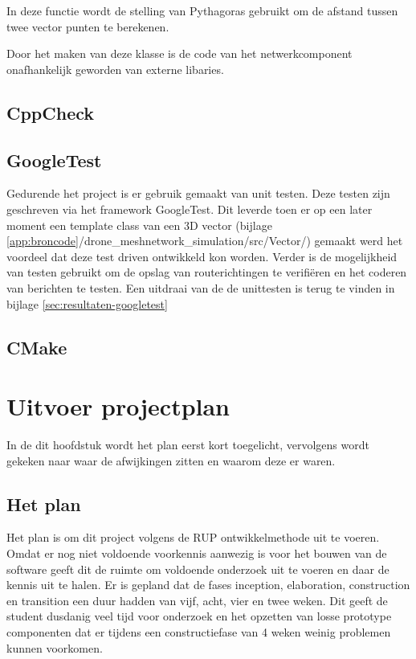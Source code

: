 \documentclass[a4paper, 11pt, oneside]{report}
\begin{document}
In deze functie wordt de stelling van Pythagoras gebruikt om de afstand tussen twee vector punten te berekenen.

Door het maken van deze klasse is de code van het netwerkcomponent onafhankelijk geworden van externe libaries.

\section{CppCheck}

\section{GoogleTest}

Gedurende het project is er gebruik gemaakt van unit testen. 
Deze testen zijn geschreven via het framework GoogleTest.
Dit leverde toen er op een later moment een template class van een 3D vector (bijlage \ref{app:broncode}/drone\_meshnetwork\_simulation/src/Vector/) gemaakt werd het voordeel dat deze test driven ontwikkeld kon worden.  
Verder is de mogelijkheid van testen gebruikt om de opslag van routerichtingen te verifiëren en het coderen van berichten te testen.
Een uitdraai van de de unittesten is terug te vinden in bijlage \ref{sec:resultaten-googletest}
\section{CMake}

\chapter{Uitvoer projectplan}\label{sec:uitvoer-projectplan}
In de dit hoofdstuk wordt het plan eerst kort toegelicht, vervolgens wordt gekeken naar waar de afwijkingen zitten en waarom deze er waren.


\section{Het plan}\label{sec:het-plan}
Het plan is om dit project volgens de RUP ontwikkelmethode uit te voeren. 
Omdat er nog niet voldoende voorkennis aanwezig is voor het bouwen van de software geeft dit de ruimte om voldoende onderzoek uit te voeren en daar de kennis uit te halen. 
Er is gepland dat de fases inception, elaboration, construction en transition een duur hadden van vijf, acht, vier en twee weken. Dit geeft de student dusdanig veel tijd voor onderzoek en het opzetten van losse prototype componenten dat er tijdens een constructiefase van 4 weken weinig problemen kunnen voorkomen. 
\end{document}
